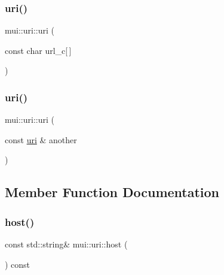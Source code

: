 \mbox{\label{classmui_1_1uri_a6f19d39b0f85dfafdc63480473871d19}} 
\subsubsection{\texorpdfstring{uri()}{uri()}\hspace{0.1cm}{\footnotesize\ttfamily [2/3]}}
{\footnotesize\ttfamily mui\+::uri\+::uri (\begin{DoxyParamCaption}\item[{const char}]{url\+\_\+c\mbox{[}$\,$\mbox{]} }\end{DoxyParamCaption})\hspace{0.3cm}{\ttfamily [inline]}}

\mbox{\label{classmui_1_1uri_a1f4ba35785bb99ac8d34fe61ba9e2408}} 
\subsubsection{\texorpdfstring{uri()}{uri()}\hspace{0.1cm}{\footnotesize\ttfamily [3/3]}}
{\footnotesize\ttfamily mui\+::uri\+::uri (\begin{DoxyParamCaption}\item[{const \hyperlink{classmui_1_1uri}{uri} \&}]{another }\end{DoxyParamCaption})\hspace{0.3cm}{\ttfamily [delete]}}



\subsection{Member Function Documentation}
\mbox{\label{classmui_1_1uri_aa1b6926eb9f5d4abcc7d2b874fa24210}} 
\subsubsection{\texorpdfstring{host()}{host()}}
{\footnotesize\ttfamily const std\+::string\& mui\+::uri\+::host (\begin{DoxyParamCaption}{ }\end{DoxyParamCaption}) const\hspace{0.3cm}{\ttfamily [inline]}}

